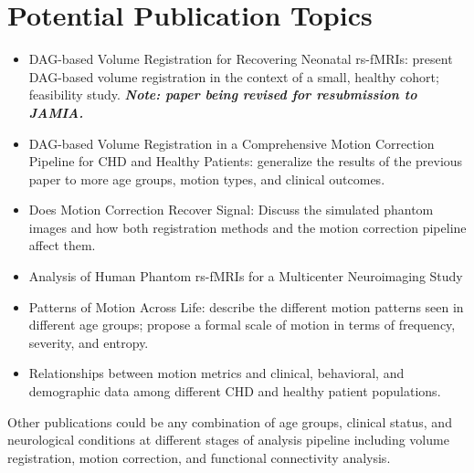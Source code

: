 \chapter{Potential Publication Topics}

\begin{itemize}
\item DAG-based Volume Registration for Recovering Neonatal rs-fMRIs:  present DAG-based volume registration in the context of a small, healthy cohort; feasibility study. \textbf{\textit{Note: paper being revised for resubmission to JAMIA.}}

\item DAG-based Volume Registration in a Comprehensive Motion Correction Pipeline for CHD and Healthy Patients: generalize the results of the previous paper to more age groups, motion types, and clinical outcomes.

\item Does Motion Correction Recover Signal: Discuss the simulated phantom images and how both registration methods and the motion correction pipeline affect them.

\item Analysis of Human Phantom rs-fMRIs for a Multicenter Neuroimaging Study

\item Patterns of Motion Across Life: describe the different motion patterns seen in different age groups; propose a formal scale of motion in terms of frequency, severity, and entropy.

\item  Relationships between motion metrics and clinical, behavioral, and demographic data among different CHD and healthy patient populations.
\end{itemize}

Other publications could be any combination of age groups, clinical status, and neurological conditions at different stages of analysis pipeline including volume registration, motion correction, and functional connectivity analysis.